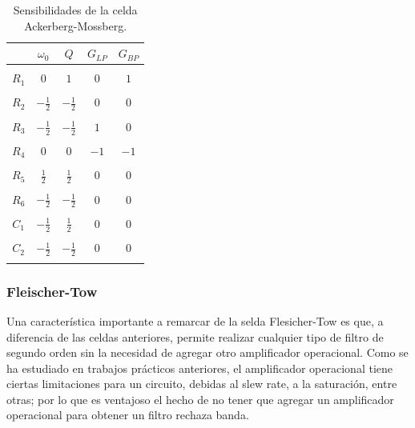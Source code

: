 \begin{table}[h!]
	\centering
	\begin{tabular}{c c c c c }
		& $\omega_0$ & $Q$ &$G_{LP}$ & $G_{BP}$\\
		\hline \\
		$R_1$ & $0$ & $1$ & $0$ & $1$\\ \\
		$R_2$ & $-\frac{1}{2}$ & $-\frac{1}{2}$ & $0$ & $0$\\ \\
		$R_3$ & $-\frac{1}{2}$ & $-\frac{1}{2}$ & $1$ & $0$ \\ \\
		$R_4$ & $0$ & $0$ & $-1$ & $-1$ \\ \\
		$R_5$ & $\frac{1}{2}$ & $\frac{1}{2}$ & $0$ & $0$ \\ \\
		$R_6$ & $-\frac{1}{2}$ & $-\frac{1}{2}$ & $0$ & $0$ \\ \\
		$C_1$ & $-\frac{1}{2} $ & $\frac{1}{2}$ & $0$ & $0$\\ \\
		$C_2$ & $-\frac{1}{2}$ & $-\frac{1}{2}$ & $0$ & $0$\\ \\
		\hline
	\end{tabular}
	\caption{Sensibilidades de la celda Ackerberg-Mossberg.}
	\label{sens_am}
\end{table}

\subsubsection{Fleischer-Tow}

Una caracter\'istica importante a remarcar de la selda Flesicher-Tow es que, a diferencia de las celdas anteriores, permite realizar cualquier tipo de filtro de segundo orden sin la necesidad de agregar otro amplificador operacional. Como se ha estudiado en trabajos pr\'acticos anteriores, el amplificador operacional tiene ciertas limitaciones para un circuito, debidas al slew rate, a la saturaci\'on, entre otras; por lo que es ventajoso el hecho de no tener que agregar un amplificador operacional para obtener un filtro rechaza banda.


